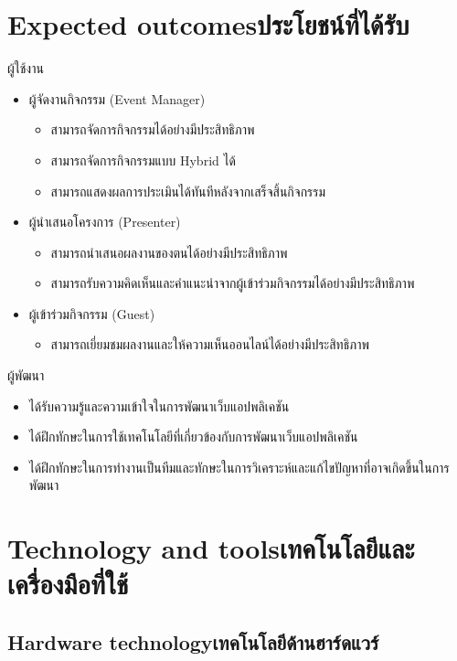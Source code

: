 \section{\ifenglish Expected outcomes\else ประโยชน์ที่ได้รับ\fi}
ผู้ใช้งาน
\begin{itemize}
    \item ผู้จัดงานกิจกรรม (Event Manager)
          \begin{itemize}
              \item สามารถจัดการกิจกรรมได้อย่างมีประสิทธิภาพ
              \item สามารถจัดการกิจกรรมแบบ Hybrid ได้
              \item สามารถแสดงผลการประเมินได้ทันทีหลังจากเสร็จสิ้นกิจกรรม
          \end{itemize}
    \item ผู้นำเสนอโครงการ (Presenter)
          \begin{itemize}
              \item สามารถนำเสนอผลงานของตนได้อย่างมีประสิทธิภาพ
              \item สามารถรับความคิดเห็นและคำแนะนำจากผู้เข้าร่วมกิจกรรมได้อย่างมีประสิทธิภาพ
          \end{itemize}
    \item ผู้เข้าร่วมกิจกรรม (Guest)
          \begin{itemize}
              \item สามารถเยี่ยมชมผลงานและให้ความเห็นออนไลน์ได้อย่างมีประสิทธิภาพ
          \end{itemize}
\end{itemize}
ผู้พัฒนา
\begin{itemize}
    \item ได้รับความรู้และความเข้าใจในการพัฒนาเว็บแอปพลิเคชัน
    \item ได้ฝึกทักษะในการใช้เทคโนโลยีที่เกี่ยวข้องกับการพัฒนาเว็บแอปพลิเคชัน
    \item ได้ฝึกทักษะในการทำงานเป็นทีมและทักษะในการวิเคราะห์และแก้ไขปัญหาที่อาจเกิดขึ้นในการพัฒนา
\end{itemize}

\section{\ifenglish Technology and tools\else เทคโนโลยีและเครื่องมือที่ใช้\fi}

\subsection{\ifenglish Hardware technology\else เทคโนโลยีด้านฮาร์ดแวร์\fi}

